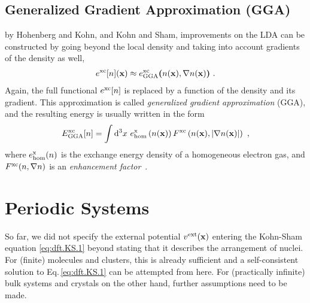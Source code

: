 \subsection{Generalized Gradient Approximation (GGA)}
 by Hohenberg and Kohn, and Kohn and Sham, improvements on the LDA can be constructed by going beyond the local density and taking into account gradients of the density as well,
\begin{align}
	e^{\rm xc} [n] ({\bf x})
		\approx e^{\rm xc}_{\rm GGA} \bm ( n({\bf x}), \nabla n({\bf x}) \bm )~.
	\label{eq:dft.exc.gga.1}
\end{align}
Again, the full functional $e^{\rm xc}[n]$ is replaced by a function of the density and its gradient. This approximation is called \emph{generalized gradient approximation} (GGA), and the resulting energy is usually written in the form
\begin{align}
		E^{\rm xc}_{\rm GGA}[n] 
		= \int \d^3 x ~ e^{\rm x}_{\rm hom} \left(n ({\bf x}) \right) 
			F^{\rm xc} \left(n ({\bf x}), \lvert \nabla n ({\bf x})\rvert \right)~,
		\label{eq:dft.GGA.1}
\end{align}
where $e^{\rm x}_{\rm hom}(n)$ is the exchange energy density of a homogeneous electron gas, and $F^{\rm xc}(n, \nabla n)$ is an \emph{enhancement factor}~\cite{Perdew1992}.

\vfill

\section{Periodic Systems}
\label{sec:theory.periodic.1}
So far, we did not specify the external potential $v^{\rm ext} ({\bf x})$ entering the Kohn-Sham equation \eqref{eq:dft.KS.1} beyond stating that it describes the arrangement of nuclei. For (finite) molecules and clusters, this is already sufficient and a self-consistent solution to Eq.\,\eqref{eq:dft.KS.1} can be attempted from here. For (practically infinite) bulk systems and crystals on the other hand, further assumptions need to be made.

